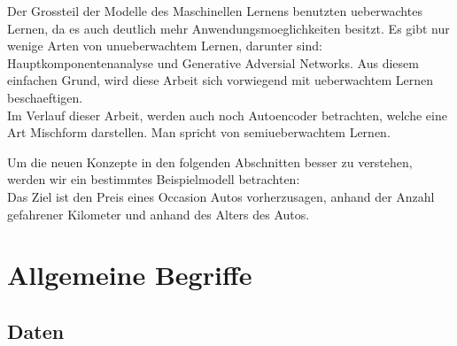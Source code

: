 Der Grossteil der Modelle des Maschinellen Lernens benutzten ueberwachtes
Lernen, da es auch deutlich mehr Anwendungsmoeglichkeiten besitzt. Es gibt nur wenige Arten von
unueberwachtem Lernen, darunter sind: Hauptkomponentenanalyse und Generative
Adversial Networks. Aus diesem einfachen Grund, wird diese Arbeit sich
vorwiegend mit ueberwachtem Lernen beschaeftigen. \\
Im Verlauf dieser Arbeit, werden auch noch Autoencoder betrachten, welche eine
Art Mischform darstellen. Man spricht von semiueberwachtem Lernen.
\para{}

Um die neuen Konzepte in den folgenden Abschnitten besser zu verstehen, werden
wir ein bestimmtes Beispielmodell betrachten:\\
Das Ziel ist den Preis eines Occasion Autos vorherzusagen, anhand der Anzahl
gefahrener Kilometer und anhand des Alters des Autos.

\para{}
\cite{wiki:supervised_learning}
\cite{wiki:unsupervised_learning}

\section{Allgemeine Begriffe}

\subsection{Daten}

